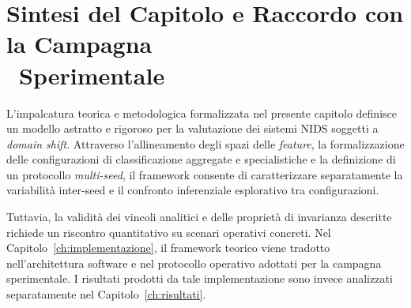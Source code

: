 \section[Sintesi del Capitolo e Raccordo con la Campagna Sperimentale]{Sintesi del Capitolo e Raccordo con la Campagna \\\ Sperimentale}
\label{sec:sintesi_raccordo_ch4}

L'impalcatura teorica e metodologica formalizzata nel presente capitolo definisce un modello astratto e rigoroso per la valutazione dei sistemi NIDS soggetti a \textit{domain shift}. 
Attraverso l'allineamento degli spazi delle \textit{feature}, la formalizzazione delle configurazioni di classificazione aggregate e specialistiche e la definizione di un protocollo \textit{multi-seed}, il framework consente di caratterizzare separatamente la variabilità inter-seed e il confronto inferenziale esplorativo tra configurazioni.

Tuttavia, la validità dei vincoli analitici e delle proprietà di invarianza descritte richiede un riscontro quantitativo su scenari operativi concreti. 
Nel Capitolo~\ref{ch:implementazione}, il framework teorico viene tradotto nell'architettura software e nel protocollo operativo adottati per la campagna sperimentale. I risultati prodotti da tale implementazione sono invece analizzati separatamente nel Capitolo~\ref{ch:risultati}.